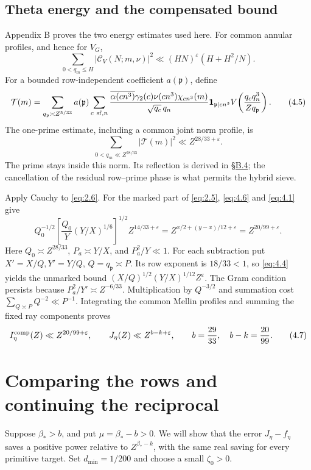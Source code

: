 \documentclass[11pt,a4paper]{article}
\begin{document}
\subsection{Theta energy and the compensated bound}\label{sec:4.2}

Appendix B proves the two energy estimates used here. For common annular profiles, and hence for \(V_G\), \[
 \sum_{0<q_m\le H}|\mathcal C_V(N;m,\nu)|^2
 \ll(HN)^\varepsilon(H+H^2/N).
\tag{4.4}\label{eq:4.4}
\] For a bounded row-independent coefficient \(a(\mathfrak p)\), define \[
 \mathcal T(m)=\sum_{q_{\mathfrak p}\asymp Z^{5/33}}a(\mathfrak p)
 \sum_{c\ {\rm sf},n}\frac{\overline{\alpha(cn^3)}\gamma_2(c)\nu(cn^3)\chi_{cn^3}(m)}
 {\sqrt{q_c}\,q_n}\mathbf1_{\mathfrak p\mid cn^3}
 V\!\left(\frac{q_cq_n^3}{Zq_{\mathfrak p}}\right).
\tag{4.5}\label{eq:4.5}
\] The one-prime estimate, including a common joint norm profile, is \[
 \sum_{0<q_m\ll Z^{28/33}}|\mathcal T(m)|^2\ll Z^{28/33+\varepsilon}.
\tag{4.6}\label{eq:4.6}
\] The prime stays inside this norm. Its reflection is derived in \hyperref[sec:B.4]{§B.4}; the cancellation of the residual row--prime phase is what permits the hybrid sieve.

Apply Cauchy to \eqref{eq:2.6}. For the marked part of \eqref{eq:2.5}, \eqref{eq:4.6} and \eqref{eq:4.1} give \[
 Q_0^{-1/2}\left[\frac{Q_0}{Y}(Y/X)^{1/6}\right]^{1/2}
 Z^{14/33+\varepsilon}
 =Z^{x/2+(y-x)/12+\varepsilon}=Z^{20/99+\varepsilon}.
\] Here \(Q_0\asymp Z^{28/33}\), \(P_a\asymp Y/X\), and \(P_a^2/Y\ll1\). For each subtraction put \(X'=X/Q,Y'=Y/Q\), \(Q=q_{\mathfrak p}\asymp P\). Its row exponent is \(18/33<1\), so \eqref{eq:4.4} yields the unmarked bound \((X/Q)^{1/2}(Y/X)^{1/12}Z^\varepsilon\). The Gram condition persists because \(P_a^2/Y'\asymp Z^{-6/33}\). Multiplication by \(Q^{-3/2}\) and summation cost \(\sum_{Q\asymp P}Q^{-2}\ll P^{-1}\). Integrating the common Mellin profiles and summing the fixed ray components proves \[
 I_\eta^{\rm comp}(Z)\ll Z^{20/99+\varepsilon},\qquad
 J_\eta(Z)\ll Z^{b-k+\varepsilon},\qquad b=\frac{29}{33},\quad b-k=\frac{20}{99}.
\tag{4.7}\label{eq:4.7}
\]

\section{Comparing the rows and continuing the reciprocal}\label{sec:5}

Suppose \(\beta_*>b\), and put \(\mu=\beta_*-b>0\). We will show that the error \(J_\eta-f_\eta\) saves a positive power relative to \(Z^{\beta_*-k}\), with the same real saving for every primitive target. Set \(d_{\min}=1/200\) and choose a small \(\zeta_0>0\).
\end{document}
